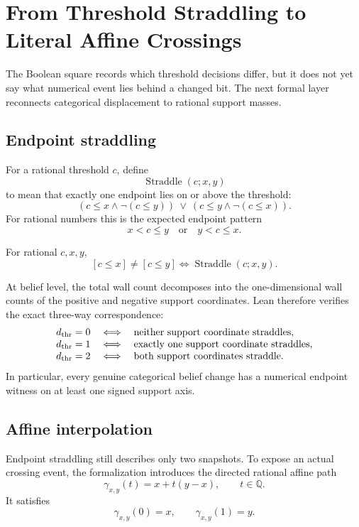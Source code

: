 \section{From Threshold Straddling to Literal Affine Crossings}
\label{sec:affine}

The Boolean square records which threshold decisions differ, but it does not yet say what numerical event lies behind a changed bit. The next formal layer reconnects categorical displacement to rational support masses.

\subsection{Endpoint straddling}

For a rational threshold \(c\), define
\[
  \operatorname{Straddle}(c;x,y)
\]
to mean that exactly one endpoint lies on or above the threshold:
\[
  (c\le x\land\neg(c\le y))
  \ \lor\ 
  (c\le y\land\neg(c\le x)).
\]
For rational numbers this is the expected endpoint pattern
\[
  x<c\le y
  \quad\text{or}\quad
  y<c\le x.
\]

\begin{theorem}
For rational \(c,x,y\),
\[
  [c\le x]\neq[c\le y]
  \iff
  \operatorname{Straddle}(c;x,y).
\]
\statusverified
\end{theorem}

At belief level, the total wall count decomposes into the one-dimensional wall counts of the positive and negative support coordinates. Lean therefore verifies the exact three-way correspondence:
\[
\begin{array}{ccl}
d_{\mathrm{thr}}=0 &\iff& \text{neither support coordinate straddles},\\
d_{\mathrm{thr}}=1 &\iff& \text{exactly one support coordinate straddles},\\
d_{\mathrm{thr}}=2 &\iff& \text{both support coordinates straddle}.
\end{array}
\]
In particular, every genuine categorical belief change has a numerical endpoint witness on at least one signed support axis.

\subsection{Affine interpolation}

Endpoint straddling still describes only two snapshots. To expose an actual crossing event, the formalization introduces the directed rational affine path
\[
  \gamma_{x,y}(t)=x+t(y-x),
  \qquad t\in\mathbb{Q}.
\]
It satisfies
\[
  \gamma_{x,y}(0)=x,
  \qquad
  \gamma_{x,y}(1)=y.
\]

